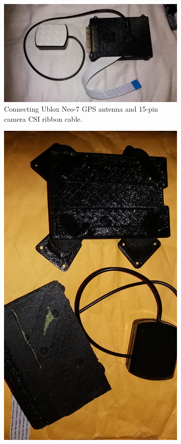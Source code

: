 \begin{figure}[H]
\begin{subfigure}{0.5\textwidth}
\centering
\includegraphics[scale=0.1]{images/drone-build-3dcase-gps.jpg}
\caption{Connecting Ublox Neo-7 GPS antenna and 15-pin camera CSI ribbon cable.}
\label{fig:stab_gps}
\end{subfigure}
\begin{subfigure}{0.5\textwidth}
\centering
\includegraphics[scale=0.1]{images/drone-build-3dplatform.jpg}

\end{subfigure}
\end{figure}
